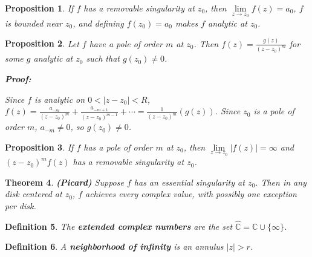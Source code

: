 \documentclass{article}
\theoremstyle{colontheorem}
\newtheorem{theorem}{Theorem}[section]
\newtheorem{proposition}[theorem]{Proposition}
\newtheorem{definition}[theorem]{Definition}
\newenvironment{Theorem}
{
	\begin{mdframed}[backgroundcolor=TheoremOrange!10]
	\begin{theorem}
}
{
	\end{theorem}
	\end{mdframed}
	
	\vspace{.15in}
}
\newenvironment{Proposition}
{
	\begin{mdframed}[backgroundcolor=TheoremOrange!10]
	\begin{proposition}
}
{
	\end{proposition}
	\end{mdframed}
	
	\vspace{.15in}
}
\newenvironment{Def}
{
	\begin{mdframed}[backgroundcolor=DefGreen!10]
	\begin{definition}
}
{
	\end{definition}
	\end{mdframed}
	
	\vspace{.15in}
}
\newenvironment{Proof}
{
	\begin{mdframed}[backgroundcolor=ProofPurple!10]
	\textbf{Proof:}%
}
{
	\end{mdframed}
	
	\vspace{.085in}
}
\begin{document}
\begin{Proposition}
	
	If $f$ has a removable singularity at $z_0$, then $\lim\limits_{z \to z_0} f(z) = a_0$, $f$ is bounded near $z_0$, and defining $f(z_0) = a_0$ makes $f$ analytic at $z_0$.
	
\end{Proposition}



\begin{Proposition}
	
	Let $f$ have a pole of order $m$ at $z_0$. Then $f(z) = \frac{g(z)}{(z - z_0)^m}$ for some $g$ analytic at $z_0$ such that $g(z_0) \neq 0$.
	
	\begin{Proof}
		Since $f$ is analytic on $0 < |z - z_0| < R$, $f(z) = \frac{a_{-m}}{(z - z_0)^m} + \frac{a_{-m + 1}}{(z - z_0)^{m - 1}} + \cdots = \frac{1}{(z - z_0)^m} (g(z))$. Since $z_0$ is a pole of order $m$, $a_{-m} \neq 0$, so $g(z_0) \neq 0$.
		
	\end{Proof}
	
\end{Proposition}



\begin{Proposition}
	
	If $f$ has a pole of order $m$ at $z_0$, then $\lim\limits_{z \to z_0} |f(z)| = \infty$ and $(z - z_0)^m f(z)$ has a removable singularity at $z_0$.
	
\end{Proposition}



\begin{Theorem}
	
	\textbf{(Picard)} Suppose $f$ has an essential singularity at $z_0$. Then in any disk centered at $z_0$, $f$ achieves every complex value, with possibly one exception per disk.
	
\end{Theorem}



\begin{Def}
	
	The \textbf{extended complex numbers} are the set $\hat{\mathbb{C}} = \mathbb{C} \cup \{\infty\}$.
	
\end{Def}



\begin{Def}
	
	A \textbf{neighborhood of infinity} is an annulus $|z| > r$.
	
\end{Def}
\end{document}
